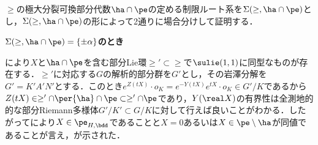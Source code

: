 \begin{npfwn}%
  $\ge$の極大分裂可換部分代数$\ha\cap\pe$の定める制限ルート系を$\Sigma(\ge,\ha\cap\pe) $とし，$\Sigma(\ge,\ha\cap\pe) $の形によって2通りに場合分けして証明する．
  
  \textbf{$\Sigma(\ge,\ha\cap\pe) = \{\pm\alpha \}$のとき}
  
  により$X$と$\ha\cap\pe $を含む部分Lie環$\ge' \subset \ge $で$\sulie(1,1) $に同型なものが存在する．$\ge' $に対応する$G$の解析的部分群を$G'$とし，その岩澤分解を$G' = K'A'N' $とする．このとき$e^{Z(t X)}\cdot o_K = e^{-Y(tX)}e^{tX}\cdot o_K\in G'/K $であるから$Z(tX)\in \ge'\cap \per{\ha}\cap \pe\subset \ge'\cap\pe $であり，$Y(\real X) $の有界性は全測地的的な部分Riemann多様体$G'/K'\subset G/K$に対して行えば良いことがわかる．したがってにより$X\in\pe_{H,\bdd}$であることと$ X = 0 $あるいは$X\in \pe\setminus\ha $が同値であることが言え，が示された．
  

  
  
  


\end{npfwn}
